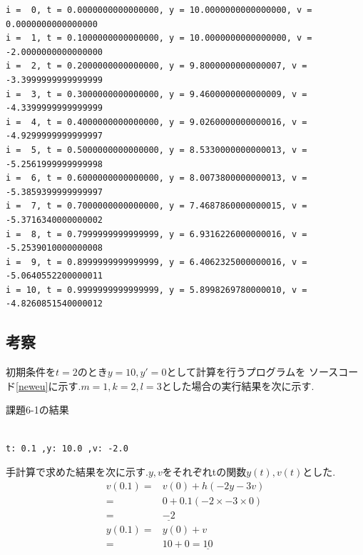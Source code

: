 \begin{lstlisting}[style=text,caption=課題7の実行結果,label=lst:kekka7]
i =  0, t = 0.0000000000000000, y = 10.0000000000000000, v = 0.0000000000000000
i =  1, t = 0.1000000000000000, y = 10.0000000000000000, v = -2.0000000000000000
i =  2, t = 0.2000000000000000, y = 9.8000000000000007, v = -3.3999999999999999
i =  3, t = 0.3000000000000000, y = 9.4600000000000009, v = -4.3399999999999999
i =  4, t = 0.4000000000000000, y = 9.0260000000000016, v = -4.9299999999999997
i =  5, t = 0.5000000000000000, y = 8.5330000000000013, v = -5.2561999999999998
i =  6, t = 0.6000000000000000, y = 8.0073800000000013, v = -5.3859399999999997
i =  7, t = 0.7000000000000000, y = 7.4687860000000015, v = -5.3716340000000002
i =  8, t = 0.7999999999999999, y = 6.9316226000000016, v = -5.2539010000000008
i =  9, t = 0.8999999999999999, y = 6.4062325000000016, v = -5.0640552200000011
i = 10, t = 0.9999999999999999, y = 5.8998269780000010, v = -4.8260851540000012
\end{lstlisting}

\subsection{考察}
初期条件を$t=2$のとき$y=10,y'=0$として計算を行うプログラムを
ソースコード\ref{neweu}に示す.$m=1,k=2,l=3$とした場合の実行結果を次に示す.
\begin{breakitembox}[l]{課題6-1の結果}
\begin{verbatim}

t: 0.1 ,y: 10.0 ,v: -2.0

\end{verbatim}
\end{breakitembox}
手計算で求めた結果を次に示す.$y,v$をそれぞれtの関数$y(t),v(t)$とした.
\begin{equation*}
\begin{split}
v(0.1)=& v(0) + h(-2y-3v)\\
=& 0+0.1(-2\times-3\times0)\\ 
=& \underline{-2}\\
y(0.1)=& y(0)+v\\
=&10 + 0 = \underline{10}
\end{split}
\end{equation*}

